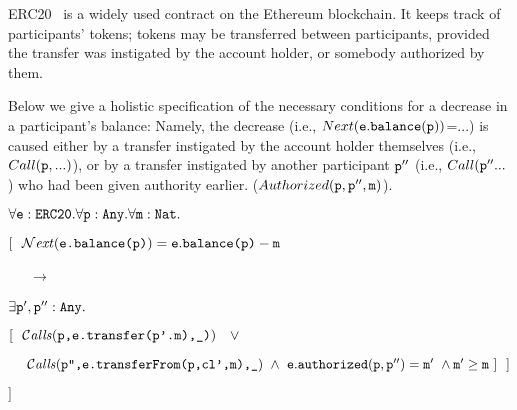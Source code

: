 {
 ERC20~\cite{ERC20} is a widely used contract on the Ethereum blockchain. It keeps track of participants' tokens;  tokens may be transferred between participants, provided
 the transfer was instigated by the account holder, or somebody authorized by them.

Below we give a holistic specification of 
the necessary conditions for a %
 decrease in  a participant's balance:  %
 Namely, the decrease (i.e.,  $Next({\mbox{\tt{e}}}.{\mbox{\tt{balance}}}({\mbox{\tt{p}}}))$=$...$)  
is caused either by a transfer instigated by the account holder themselves (i.e., $Call({\mbox{\tt{p}}},...)$), or by
a transfer instigated by another participant ${\mbox{\tt{p}}}''$  (i.e., $Call({\mbox{\tt{p}}}''...$) who   had   been given authority earlier.
($Authorized({\mbox{\tt{p}}},{\mbox{\tt{p}}}'',{\mbox{\tt{m}}})$). 


\noindent  
\strut \hspace{0.3cm} $\forall {\mbox{\tt{e}}}:{\mbox{\tt{ERC20}}}.\forall {\mbox{\tt{p}}}:{\mbox{\tt{Any}}}.\forall {\mbox{\tt{m}}}:{\mbox{\tt{Nat}}}.$\\
\strut \hspace{0.3cm} $[\ \ \Next{\prg{e}.\prg{balance(p)}}=\prg{e}.\prg{balance(p)}-\prg{m}$ \\ %
\strut \hspace{0.4cm} \ \ \ $\longrightarrow$\\
\strut \hspace{0.4cm} $\exists {\mbox{\tt{p}}}',{\mbox{\tt{p}}}'':{\mbox{\tt{Any}}}.$ \\
\strut \hspace{0.4cm} $[\ \  \Calls{\prg{p},\prg{e.transfer(p'.m),\_)}}\  \ \  \vee\, $\\
\strut \hspace{0.4cm} $\ \ \ \ \Calls{\prg{p}'',\prg{e.transferFrom(p,cl',m),\_}}\  \wedge\   \prg{e}.\prg{authorized}(\prg{p},\prg{p}'')=\prg{m}' \ \wedge \prg{m}'\geq \prg{m} \ ] \ \  ]$\\
\strut \hspace{0.3cm} $] $

}
